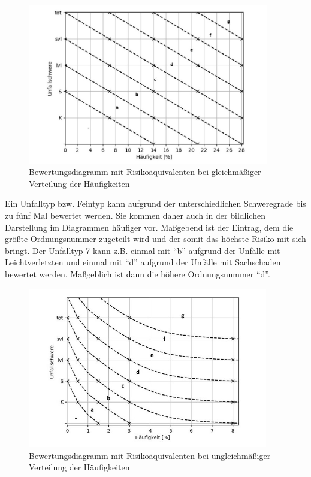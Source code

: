 \begin{savenotes}
	\begin{figure}[H]
		\centering
		\includegraphics[width=10.5cm,height=7cm]{figures/Bewertungsdiagramm}
		\caption[Bewertungsdiagramm mit Risikoäquivalenten bei gleichmäßiger Verteilung der Häufigkeiten]{Bewertungsdiagramm mit Risikoäquivalenten bei gleichmäßiger Verteilung der Häufigkeiten}\label{fig:Bewertungsdiagramm}
	\end{figure}
\end{savenotes}

Ein Unfalltyp bzw. Feintyp kann aufgrund der unterschiedlichen Schweregrade bis zu fünf Mal bewertet werden. Sie kommen daher auch in der bildlichen Darstellung im Diagrammen häufiger vor. Maßgebend ist der Eintrag, dem die größte Ordnungsnummer zugeteilt wird und der somit das höchste Risiko mit sich bringt. Der Unfalltyp 7 kann z.B. einmal mit \enquote{b} aufgrund der Unfälle mit Leichtverletzten und einmal mit \enquote{d} aufgrund der Unfälle mit Sachschaden bewertet werden. Maßgeblich ist dann die höhere Ordnungsnummer \enquote{d}.

\begin{savenotes}
	\begin{figure}[H]
		\centering
		\includegraphics[width=10.5cm,height=7cm]{figures/Bewertungsdiagramm(2)}
		\caption[Bewertungsdiagramm mit Risikoäquivalenten bei ungleichmäßiger Verteilung der Häufigkeiten]{Bewertungsdiagramm mit Risikoäquivalenten bei ungleichmäßiger Verteilung der Häufigkeiten}\label{fig:Bewertungsdiagramm(2)}
	\end{figure}
\end{savenotes}


